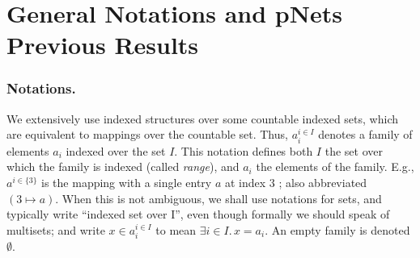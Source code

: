 \documentclass{llncs}
\newcommand{\Simon}{\\\hfill\mdash Simon}
\newcommand{\Ludo}{\\\hfill\mdash Ludo}
\newcommand{\noteIn}[2][inline,color=black!20]{\todo[#1]{{#2}}}
\newcommand{\mdash}[1][]{---#1}
\newcommand{\eg}[1][\ ]{e.g.#1}
\begin{document}

\section{General Notations and pNets Previous Results} 
\label{secn:preliminaries}


\subsubsection{Notations.}
\label{secn:notations}

We extensively use indexed structures
over some countable indexed sets, which are equivalent to mappings over
the countable set. 
Thus, 
$a_i^{i\in I}$
denotes a family of elements $a_i$ indexed over the
set $I$. %
This notation defines both $I$ the set over which the family is
indexed (called \emph{range}), and $a_i$ the elements of the family.
E.g., $a^{i\in\{3\}}$ is the mapping with a single entry $a$ at index
$3$ ; also abbreviated $(3\mapsto a)$.
When this is not
ambiguous, we shall use notations for sets, and typically write
``indexed set over I'', even though formally we should speak of multisets; and
write $x\in a_i^{i\in I}$ to mean $\exists i\in I.\, x=a_i$.  An empty
family is denoted $\emptyset$.

%
\end{document}
